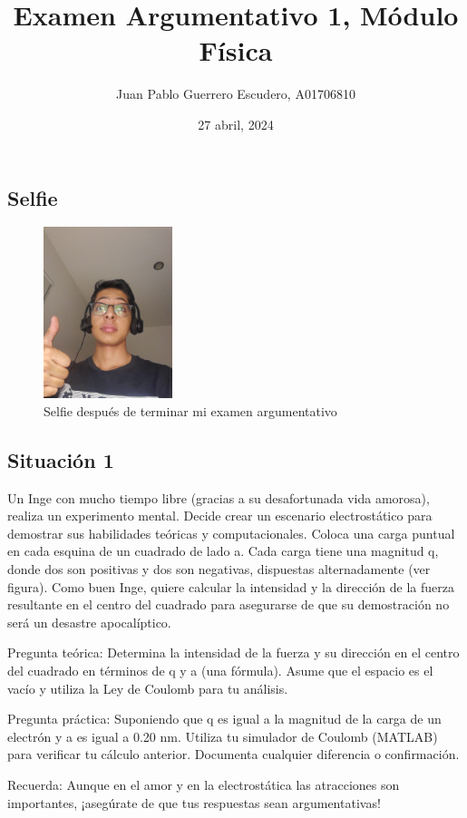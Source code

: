 \documentclass[12pt, letterpaper]{report}
\title{Examen Argumentativo 1, Módulo Física}
\author{Juan Pablo Guerrero Escudero, A01706810}
\date{27 abril, 2024}
\begin{document}
\maketitle
\subsection*{Selfie}
\begin{figure}[H]
    \centering
    \includegraphics[height = 5cm]{Selfie.jpeg}
    \caption{Selfie después de terminar mi examen argumentativo}
\end{figure}
\subsection*{Situación 1}
Un Inge con mucho tiempo libre (gracias a su desafortunada vida amorosa), realiza un experimento mental. Decide crear un escenario electrostático para demostrar sus habilidades teóricas y computacionales. Coloca una carga puntual en cada esquina de un cuadrado de lado a. Cada carga tiene una magnitud q, donde dos son positivas y dos son negativas, dispuestas alternadamente (ver figura). Como buen Inge, quiere calcular la intensidad y la dirección de la fuerza resultante en el centro del cuadrado para asegurarse de que su demostración no será un desastre apocalíptico.

Pregunta teórica: Determina la intensidad de la fuerza y su dirección en el centro del cuadrado en términos de q y a (una fórmula). Asume que el espacio es el vacío y utiliza la Ley de Coulomb para tu análisis.

Pregunta práctica: Suponiendo que q es igual a la magnitud de la carga de un electrón y a es igual a 0.20 nm. Utiliza tu simulador de Coulomb (MATLAB) para verificar tu cálculo anterior. Documenta cualquier diferencia o confirmación.

Recuerda: Aunque en el amor y en la electrostática las atracciones son importantes, ¡asegúrate de que tus respuestas sean argumentativas! \\
\end{document}
